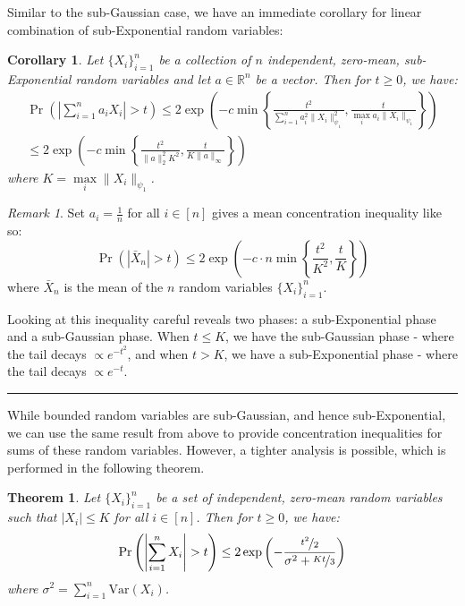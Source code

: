 \documentclass{article}
\newtheorem{theorem}{Theorem}[subsection]
\newtheorem{corollary}{Corollary}[subsection]
\theoremstyle{remark}
\newtheorem*{remark}{Remark}
\newcommand{\comprule}{\textcolor[RGB]{220,220,220}{\rule{\linewidth}{0.2pt}}}
\newcommand{\real}{\mathbb{R}}
\newcommand{\Var}{\mathrm{Var}}
\begin{document}
Similar to the sub-Gaussian case, we have an immediate corollary for linear combination of sub-Exponential random variables:
\begin{corollary}
Let \(\{X_{i}\}_{i=1}^{n}\) be a collection of \(n\) independent, zero-mean, sub-Exponential random variables and let \(a \in \real^{n}\) be a vector. Then for \(t \geq 0\), we have:
\begin{multline*}
\Pr\left(\left|\sum_{i=1}^{n} a_{i}X_{i}\right| > t\right) \leq 2\exp\left(-c \min\left\{\frac{t^{2}}{\sum\limits_{i=1}^{n}a_{i}^{2}\|X_{i}\|_{\psi_{1}}^{2}}, \frac{t}{\max\limits_{i} a_{i}\|X_{i}\|_{\psi_{1}}}\right\}\right) \\\leq 2\exp\left(-c \min\left\{\frac{t^{2}}{\|a\|_{2}^{2}K^{2}}, \frac{t}{K\|a\|_{\infty}}\right\}\right)
\end{multline*}
where \(K = \max\limits_{i} \|X_{i}\|_{\psi_{1}}\).
\end{corollary}

\begin{remark}
Set \(a_{i} = \frac{1}{n}\) for all \(i \in [n]\) gives a mean concentration inequality like so:
\begin{equation*}
\Pr\left(|\bar{X}_{n}| > t\right) \leq 2\exp\left(-c\cdot n\min\left\{\frac{t^{2}}{K^{2}}, \frac{t}{K}\right\}\right)
\end{equation*}
where \(\bar{X}_{n}\) is the mean of the \(n\) random variables \(\{X_{i}\}_{i=1}^{n}\).

Looking at this inequality careful reveals two phases: a sub-Exponential phase and a sub-Gaussian phase. When \(t \leq K\), we have the sub-Gaussian phase - where the tail decays \(\propto e^{-t^{2}}\), and when \(t > K\), we have a sub-Exponential phase - where the tail decays \(\propto e^{-t}\).
\end{remark}

\comprule

While bounded random variables are sub-Gaussian, and hence sub-Exponential, we can use the same result from above to provide concentration inequalities for sums of these random variables. However, a tighter analysis is possible, which is performed in the following theorem.

\begin{theorem}
\label{thm:bernstein-bounded-rv}
Let \(\{X_{i}\}_{i=1}^{n}\) be a set of independent, zero-mean random variables such that \(|X_{i}| \leq K\) for all \(i \in [n]\). Then for \(t \geq 0\), we have:
\begin{equation*}
\Pr\left(\left|\sum_{i=1}^{n}X_{i}\right| > t\right) \leq 2\exp\left(-\frac{\nicefrac{t^{2}}{2}}{\sigma^{2} + \nicefrac{Kt}{3}}\right)
\end{equation*}
where \(\sigma^{2} = \sum\limits_{i=1}^{n}\Var(X_{i})\).
\end{theorem}
\end{document}
